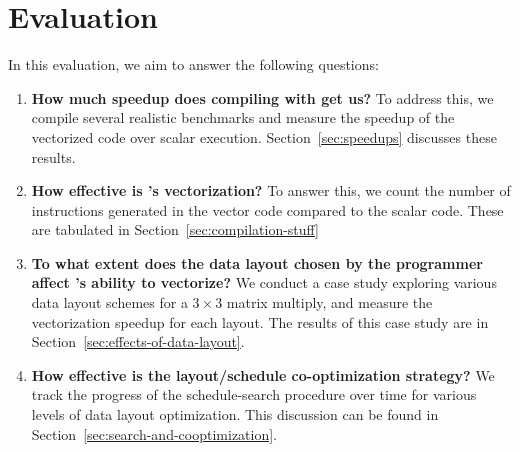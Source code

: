 \section{Evaluation}\label{sec:eval}


In this evaluation, we aim to answer the following questions:
\begin{enumerate}
    \item {\bf How much speedup does compiling with \system get us?} To address this, we compile several realistic benchmarks and measure the speedup of the vectorized code over scalar execution. Section~\ref{sec:speedups} discusses these results.
    \item {\bf How effective is \system's vectorization?} To answer this, we count the number of instructions generated in the vector code compared to the scalar code. These are tabulated in Section~\ref{sec:compilation-stuff}
    \item {\bf To what extent does the data layout chosen by the programmer affect \system's ability to vectorize?} We conduct a case study exploring various data layout schemes for a $3\times 3$ matrix multiply, and measure the vectorization speedup for each layout. The results of this case study are in Section~\ref{sec:effects-of-data-layout}.
    \item {\bf How effective is the layout/schedule co-optimization strategy?} We track the progress of the schedule-search procedure over time for various levels of data layout optimization. This discussion can be found in Section~\ref{sec:search-and-cooptimization}.
\end{enumerate}

